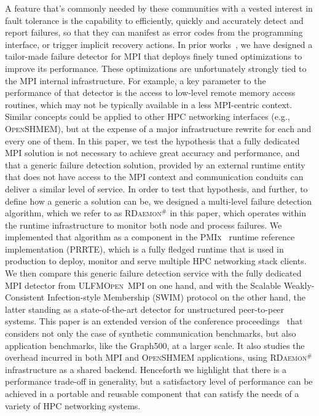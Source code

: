 \documentclass[5p,times,twocolumn]{elsarticle}
\newcommand{\prrte}[0]{\textsc{PRRTE}\xspace}
\newcommand{\pmix}[0]{\textsc{PMIx}\xspace}
\newcommand{\ompi}[0]{\textsc{Open~MPI}\xspace}
\newcommand{\ulfm}[0]{\textsc{ULFM}\xspace}
\newcommand{\mpi}[0]{\textsc{MPI}\xspace}
\newcommand{\oshmem}[0]{\textsc{OpenSHMEM}\xspace}
\newcommand{\ourwork}[0]{\textsc{RDaemon}\ensuremath{^\#}\xspace}
\begin{document}
A feature that's commonly needed by these communities with a vested
interest in fault tolerance is the capability to efficiently, quickly and
accurately detect and report failures, so that they can manifest as
error codes from the programming interface, or trigger implicit recovery
actions. In prior works~\cite{George16}, we have designed a tailor-made
failure detector for \mpi that deploys finely tuned optimizations to
improve its performance. These optimizations are unfortunately strongly
tied to the \mpi internal infrastructure. For example, a key parameter to
the performance of that detector is the
access to low-level remote memory access routines, which may not be typically
available in a less \mpi-centric context. Similar concepts could be
applied to other HPC networking interfaces (e.g., \oshmem), but at
the expense of a major infrastructure rewrite for each and every one of
them. In this paper, we test the hypothesis that a fully dedicated \mpi
solution is not necessary to achieve great accuracy and performance, and
that a generic failure detection solution, provided by an external runtime
entity that does not have access to the \mpi context and communication conduits
can deliver a similar level of service. In order to test that hypothesis,
and further, to define how a generic a solution can be, we designed
a multi-level failure detection algorithm, which we refer to as
\ourwork in this paper, which operates
within the runtime infrastructure to monitor both node and process
failures. We implemented that algorithm as a component in the \pmix~\cite{CASTAIN18} runtime reference implementation (\prrte), which is a fully fledged runtime that is
used in production to deploy, monitor and
serve multiple HPC networking stack clients.
We then compare this generic
failure detection service with the fully dedicated \mpi detector from
\ulfm \ompi on one hand, and with the Scalable Weakly-Consistent Infection-style Membership (SWIM) protocol on the other hand, the latter standing
as a state-of-the-art detector for unstructured peer-to-peer systems. 
%
This paper is an extended version of the conference proceedings~\cite{Zhong:2019:RLF:3343211.3343225} that considers not only the case of synthetic communication benchmarks, but also application benchmarks, like the Graph500, at a larger scale. It also studies the overhead incurred in both \mpi and \oshmem applications, using \ourwork infrastructure as a shared backend.
%
Henceforth
we highlight that there is a performance trade-off in generality, but a
satisfactory level of performance can be achieved in a portable and reusable
component that can satisfy the needs of a variety of HPC networking systems.
\end{document}
